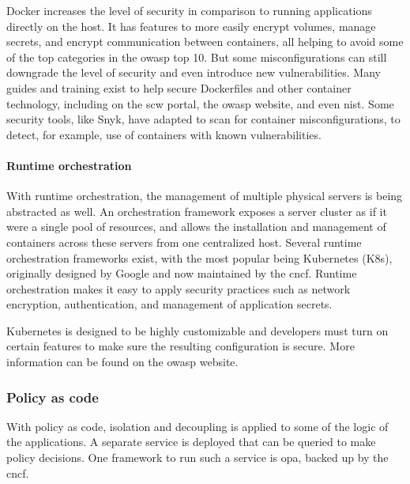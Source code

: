 Docker increases the level of security in comparison to running applications directly on the host.
It has features to more easily encrypt volumes, manage secrets, and encrypt communication between containers, all helping to avoid some of the top categories in the \gls{owasp} top 10.
But some misconfigurations can still downgrade the level of security and even introduce new vulnerabilities.
Many guides and training exist to help secure Dockerfiles and other container technology, including on the \gls{scw} portal, the \gls{owasp} website, and even \gls{nist}.
Some security tools, like Snyk, have adapted to scan for container misconfigurations, to detect, for example, use of containers with known vulnerabilities.

\paragraph{Runtime orchestration}
With runtime orchestration, the management of multiple physical servers is being abstracted as well.
An orchestration framework exposes a server cluster as if it were a single pool of resources, and allows the installation and management of containers across these servers from one centralized host.
Several runtime orchestration frameworks exist, with the most popular being Kubernetes (K8s), originally designed by Google and now maintained by the 
\gls{cncf}.
Runtime orchestration makes it easy to apply security practices such as network encryption, authentication, and management of application secrets. 

Kubernetes is designed to be highly customizable and developers must turn on certain features to make sure the resulting configuration is secure.
More information can be found on the \gls{owasp} website.

\subsubsection{Policy as code}
With policy as code, isolation and decoupling is applied to some of the logic of the applications.
A separate service is deployed that can be queried to make policy decisions.
One framework to run such a service is \gls{opa}, backed up by the \gls{cncf}.

